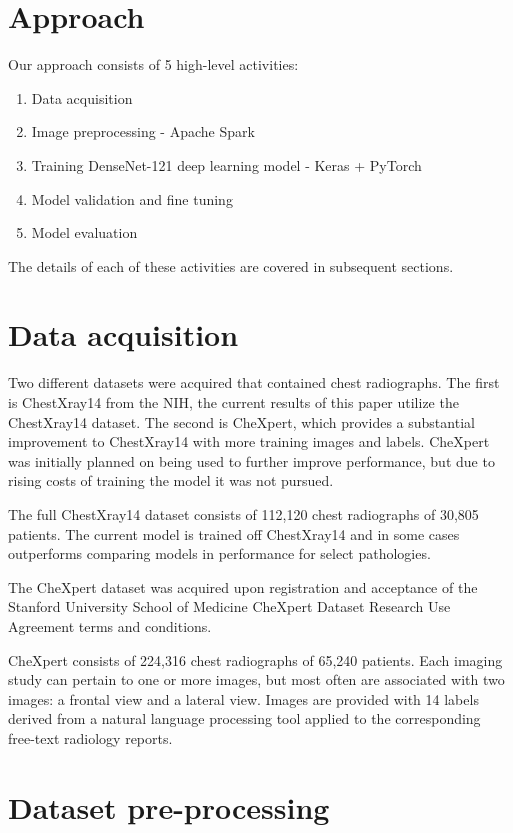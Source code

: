 \documentclass{amia}
\begin{document}
\section*{Approach}

Our approach consists of 5 high-level activities:
\begin{enumerate}
\item Data acquisition
\item Image preprocessing - Apache Spark
\item Training DenseNet-121 deep learning model - Keras + PyTorch
\item Model validation and fine tuning
\item Model evaluation
\end{enumerate}

The details of each of these activities are covered in subsequent sections.

\section*{Data acquisition}
Two different datasets were acquired that contained chest radiographs. The first is ChestXray14 from the NIH, the current results of this paper utilize the ChestXray14 dataset. The second is CheXpert, which provides a substantial improvement to ChestXray14 with more training images and labels. CheXpert was initially planned on being used to further improve performance, but due to rising costs of training the model it was not pursued.

The full ChestXray14 dataset consists of 112,120 chest radiographs of 30,805 patients. The current model is trained off ChestXray14 and in some cases outperforms comparing models in performance for select pathologies.

The CheXpert dataset was acquired upon registration and acceptance of the Stanford University School of Medicine CheXpert Dataset Research Use Agreement terms and conditions.\cite{ref2}

CheXpert consists of 224,316 chest radiographs of 65,240 patients. Each imaging study can pertain to one or more images, but most often are associated with two images: a frontal view and a lateral view. Images are provided with 14 labels derived from a natural language processing tool applied to the corresponding free-text radiology reports.


\section*{Dataset pre-processing}
\end{document}
